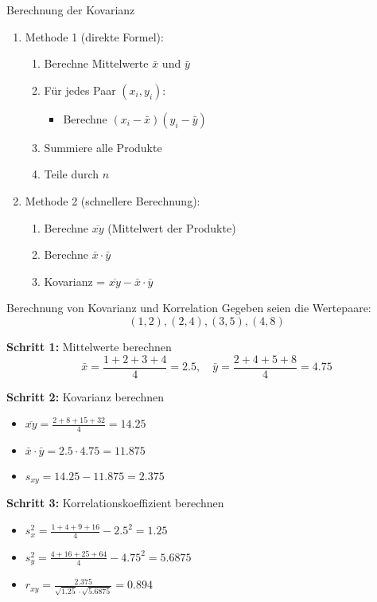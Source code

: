 \begin{KR}{Berechnung der Kovarianz}
\begin{enumerate}
    \item Methode 1 (direkte Formel):
        \begin{enumerate}
            \item Berechne Mittelwerte $\bar{x}$ und $\bar{y}$
            \item Für jedes Paar $(x_i,y_i)$:
                \begin{itemize}
                    \item Berechne $(x_i - \bar{x})(y_i - \bar{y})$
                \end{itemize}
            \item Summiere alle Produkte
            \item Teile durch $n$
        \end{enumerate}
    \item Methode 2 (schnellere Berechnung):
        \begin{enumerate}
            \item Berechne $\overline{xy}$ (Mittelwert der Produkte)
            \item Berechne $\bar{x} \cdot \bar{y}$
            \item Kovarianz = $\overline{xy} - \bar{x} \cdot \bar{y}$
        \end{enumerate}
\end{enumerate}
\end{KR}

\begin{example2}{Berechnung von Kovarianz und Korrelation}
Gegeben seien die Wertepaare:
$$(1,2), (2,4), (3,5), (4,8)$$

\textbf{Schritt 1:} Mittelwerte berechnen
$$\bar{x} = \frac{1+2+3+4}{4} = 2.5, \quad \bar{y} = \frac{2+4+5+8}{4} = 4.75$$

\textbf{Schritt 2:} Kovarianz berechnen
\begin{itemize}
    \item $\overline{xy} = \frac{2+8+15+32}{4} = 14.25$
    \item $\bar{x} \cdot \bar{y} = 2.5 \cdot 4.75 = 11.875$
    \item $s_{xy} = 14.25 - 11.875 = 2.375$
\end{itemize}

\textbf{Schritt 3:} Korrelationskoeffizient berechnen
\begin{itemize}
    \item $s_x^2 = \frac{1+4+9+16}{4} - 2.5^2 = 1.25$
    \item $s_y^2 = \frac{4+16+25+64}{4} - 4.75^2 = 5.6875$
    \item $r_{xy} = \frac{2.375}{\sqrt{1.25} \cdot \sqrt{5.6875}} = 0.894$
\end{itemize}
\end{example2}

